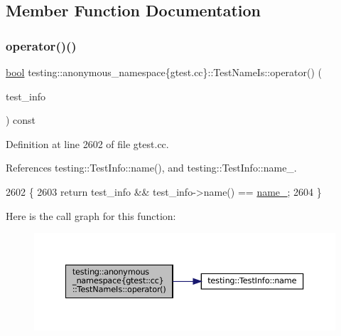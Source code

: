 \subsection{Member Function Documentation}
\mbox{\label{classtesting_1_1anonymous__namespace_02gtest_8cc_03_1_1TestNameIs_abfef5b9978381623faeb68f4ed67532a}} 
\subsubsection{\texorpdfstring{operator()()}{operator()()}}
{\footnotesize\ttfamily \hyperlink{classbool}{bool} testing\+::anonymous\+\_\+namespace\{gtest.\+cc\}\+::Test\+Name\+Is\+::operator() (\begin{DoxyParamCaption}\item[{const \hyperlink{classtesting_1_1TestInfo}{Test\+Info} $\ast$}]{test\+\_\+info }\end{DoxyParamCaption}) const\hspace{0.3cm}{\ttfamily [inline]}}



Definition at line 2602 of file gtest.\+cc.



References testing\+::\+Test\+Info\+::name(), and testing\+::\+Test\+Info\+::name\+\_\+.


\begin{DoxyCode}
2602                                                     \{
2603     \textcolor{keywordflow}{return} test\_info && test\_info->name() == \hyperlink{classtesting_1_1anonymous__namespace_02gtest_8cc_03_1_1TestNameIs_a7e6936885d47805330525cc94e4a2f00}{name\_};
2604   \}
\end{DoxyCode}
Here is the call graph for this function\+:
\nopagebreak
\begin{figure}[H]
\begin{center}
\leavevmode
\includegraphics[width=350pt]{classtesting_1_1anonymous__namespace_02gtest_8cc_03_1_1TestNameIs_abfef5b9978381623faeb68f4ed67532a_cgraph}
\end{center}
\end{figure}


